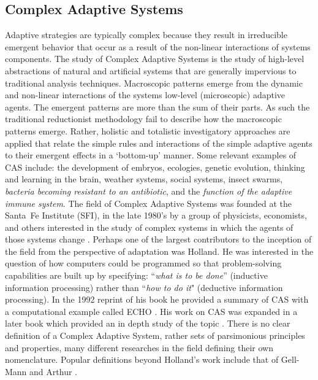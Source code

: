 \documentclass[a4paper, 11pt]{article}
\begin{document}
\subsection{Complex Adaptive Systems}
Adaptive strategies are typically complex because they result in irreducible emergent behavior that occur as a result of the non-linear interactions of systems components.
The study of Complex Adaptive Systems is the study of high-level abstractions of natural and artificial systems that are generally impervious to traditional analysis techniques. Macroscopic patterns emerge from the dynamic and non-linear interactions of the systems low-level (microscopic) adaptive agents. The emergent patterns are more than the sum of their parts. As such the traditional reductionist methodology fail to describe how the macroscopic patterns emerge. Rather, holistic and totalistic investigatory approaches are applied that relate the simple rules and interactions of the simple adaptive agents to their emergent effects in a `bottom-up' manner. 
Some relevant examples of CAS include: the development of embryos, ecologies, genetic evolution, thinking and learning in the brain, weather systems, social systems, insect swarms, \emph{bacteria becoming resistant to an antibiotic}, and the \emph{function of the adaptive immune system}. 
The field of Complex Adaptive Systems was founded at the Santa~Fe Institute (SFI), in the late 1980's by a group of physicists, economists, and others interested in the study of complex systems in which the agents of those systems change \cite{Anderson1988}. Perhaps one of the largest contributors to the inception of the field from the perspective of adaptation was Holland. He was interested in the question of how computers could be programmed so that problem-solving capabilities are built up by specifying: ``\emph{what is to be done}'' (inductive information processing) rather than ``\emph{how to do it}" (deductive information processing). In the 1992 reprint of his book he provided a summary of CAS with a computational example called ECHO \cite{Holland1975}. His work on CAS was expanded in a later book which provided an in depth study of the topic \cite{Holland1995}. 
There is no clear definition of a Complex Adaptive System, rather sets of parsimonious principles and properties, many different researches in the field defining their own nomenclature. Popular definitions beyond Holland's work include that of Gell-Mann \cite{Gell-Mann1994} and Arthur \cite{Arthur1997}.
\end{document}
